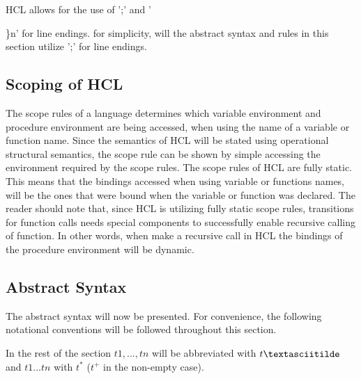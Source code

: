 HCL allows for the use of ';' and '{\}n' for line endings.
for simplicity, will the abstract syntax and rules in this section utilize ';' for line endings. 

\subsection{Scoping of HCL}
The scope rules of a language determines which variable environment and procedure environment are being accessed, when using the name of a variable or function name.
Since the semantics of HCL will be stated using operational structural semantics, the scope rule can be shown by simple accessing the environment required by the scope rules.
The scope rules of HCL are fully static.
This means that the bindings accessed when using variable or functions names, will be the ones that were bound when the variable or function was declared.
The reader should note that, since HCL is utilizing fully static scope rules, transitions for function calls needs special components to successfully enable recursive calling of function.
In other words, when make a recursive call in HCL the bindings of the procedure environment will be dynamic.

\subsection{Abstract Syntax}
The abstract syntax will now be presented.
For convenience, the following notational conventions will be followed throughout this section.

In the rest of the section $t1, .
.
.
 , tn$ will be abbreviated with $t\textasciitilde$ and $t1 .
 .
 .
  tn$ with $t^*$ ($t^+$ in the non-empty case).

}
